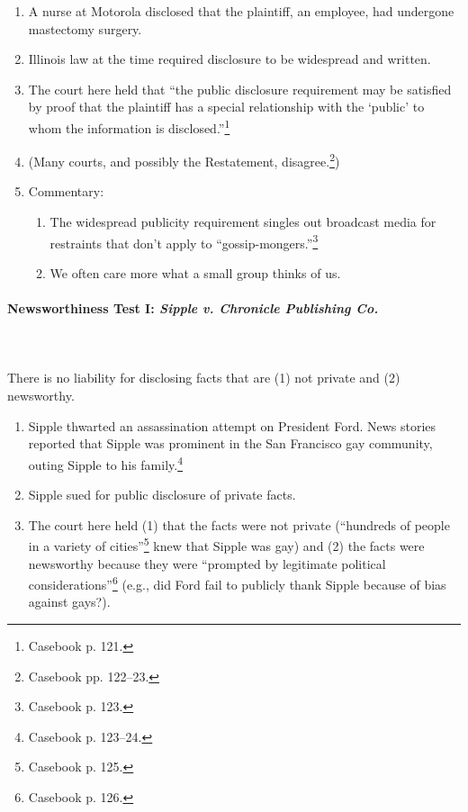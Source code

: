 \begin{enumerate}
    \item A nurse at Motorola disclosed that the plaintiff, an employee, had 
    undergone mastectomy surgery.
    \item Illinois law at the time required disclosure to be widespread and 
    written.
    \item The court here held that ``the public disclosure requirement may be 
    satisfied by proof that the plaintiff has a special relationship with the 
    `public' to whom the information is disclosed.''\footnote{Casebook p. 121.}
    \item (Many courts, and possibly the Restatement, 
    disagree.\footnote{Casebook pp. 122--23.})
    \item Commentary:
    \begin{enumerate}
        \item The widespread publicity requirement singles out broadcast media 
        for restraints that don't apply to ``gossip-mongers.''\footnote{Casebook 
        p. 123.}
        \item We often care more what a small group thinks of us.
    \end{enumerate}
\end{enumerate}

\paragraph{Newsworthiness Test I: \emph{Sipple v. Chronicle Publishing Co.}}
~\\\\
There is no liability for disclosing facts that are (1) not private and (2) 
newsworthy.

\begin{enumerate}
    \item Sipple thwarted an assassination attempt on President Ford. News 
    stories reported that Sipple was prominent in the San Francisco gay 
    community, outing Sipple to his family.\footnote{Casebook p. 123--24.}
    \item Sipple sued for public disclosure of private facts.
    \item The court here held (1) that the facts were not private (``hundreds of 
    people in a variety of cities''\footnote{Casebook p. 125.} knew that Sipple 
    was gay) and (2) the facts were newsworthy because they were ``prompted by 
    legitimate political considerations''\footnote{Casebook p. 126.} (e.g., did 
    Ford fail to publicly thank Sipple because of bias against gays?).
\end{enumerate}

